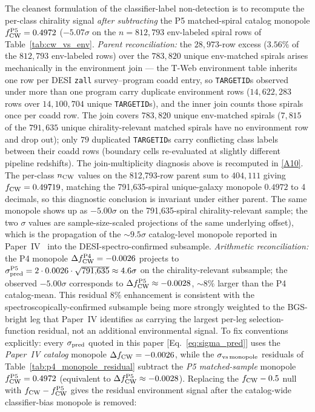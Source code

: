 \documentclass[twocolumn,linenumbers]{aastex702}
\newcommand{\repoBase}{https://github.com/Hubify-Projects/bigbounce/blob/main}
\begin{document}
The cleanest
formulation of the classifier-label non-detection is to recompute
the per-class chirality signal \emph{after subtracting} the P5
matched-spiral catalog monopole $f_{\rm CW}^{\rm P5} = 0.4972$
($-5.07\sigma$ on the $n = 812{,}793$ env-labeled spiral rows of
Table~\ref{tab:cw_vs_env}. \emph{Parent reconciliation:} the
$28{,}973$-row excess ($3.56\%$ of the $812{,}793$ env-labeled rows) over the $783{,}820$ unique
env-matched spirals arises mechanically in the
environment join — the T-Web environment table inherits one row per
DESI \texttt{zall} survey--program coadd entry, so \texttt{TARGETID}s
observed under more than one program carry duplicate environment rows
($14{,}622{,}283$ rows over $14{,}100{,}704$ unique
\texttt{TARGETID}s), and the inner join counts those spirals once per
coadd row. The join covers $783{,}820$ unique env-matched spirals
($7{,}815$ of the $791{,}635$ unique chirality-relevant matched spirals have no environment row and drop out); only $79$
duplicated \texttt{TARGETID}s carry conflicting class labels between
their coadd rows (boundary cells re-evaluated at slightly different
pipeline redshifts). The join-multiplicity diagnosis above is recomputed in
\href{\repoBase/pipelines/p5\_desi\_chirality/outputs/17\_v0151\_closure\_recomputes.json}{[A10]}. The per-class
$n_{\rm CW}$ values on the 812{,}793-row parent sum to
$404{,}111$ giving $f_{\rm CW} = 0.49719$, matching the 791{,}635-spiral
unique-galaxy monopole $0.4972$ to 4 decimals, so this diagnostic
conclusion is
invariant under either parent. The same monopole shows up as
$-5.00\sigma$ on the
791{,}635-spiral chirality-relevant sample; the two $\sigma$ values
are sample-size-scaled projections of the same underlying offset),
which is the propagation of the
$\sim\!9.5\sigma$ catalog-level monopole reported in
Paper~IV~\cite{golden_chirality_2026} into the DESI-spectro-confirmed
subsample. \emph{Arithmetic reconciliation:} the P4 monopole
$\Delta f_{\rm CW}^{\rm P4} = -0.0026$ projects to
$\sigma_{\rm pred}^{\rm P5} = 2 \cdot 0.0026 \cdot \sqrt{791{,}635}
\approx 4.6\sigma$ on the chirality-relevant subsample; the observed
$-5.00\sigma$ corresponds to $\Delta f_{\rm CW}^{\rm P5} \approx
-0.0028$, ${\sim}8\%$ larger than the P4 catalog-mean. This residual
$8\%$ enhancement is consistent with the spectroscopically-confirmed
subsample being more strongly weighted to the BGS-bright leg that
Paper~IV identifies as carrying the largest per-leg
selection-function residual, not an additional environmental signal.
To fix conventions explicitly: every $\sigma_{\rm pred}$ quoted in
this paper [Eq.~\eqref{eq:sigma_pred}] uses the \emph{Paper~IV
catalog} monopole $\Delta f_{\rm CW} = -0.0026$, while the
$\sigma_{\rm vs\,monopole}$ residuals of
Table~\ref{tab:p4_monopole_residual} subtract the \emph{P5
matched-sample} monopole $f_{\rm CW}^{\rm P5} = 0.4972$ (equivalent
to $\Delta f_{\rm CW}^{\rm P5} \approx -0.0028$). Replacing the $f_{\rm CW} - 0.5$ null with
$f_{\rm CW} - f_{\rm CW}^{\rm P5}$ gives the residual environment
signal after the catalog-wide classifier-bias monopole is removed:
\end{document}
